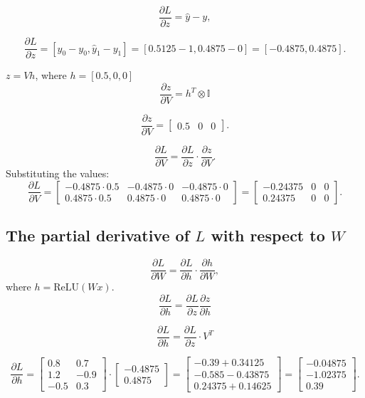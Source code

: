 \documentclass[12pt]{ass1.cls}
\begin{document}
\[
\frac{\partial L}{\partial z} = \hat{y} - y,
\]

\[
\frac{\partial L}{\partial z} = [\hat{y}_0 - y_0, \hat{y}_1 - y_1] = [0.5125 - 1, 0.4875 - 0] = [-0.4875, 0.4875].
\]

                                                            \( z = Vh \), where \( h = [0.5, 0, 0] \)
\[
\frac{\partial z}{\partial V} = h^T\otimes \mathbb{I}
\]


\[
\frac{\partial z}{\partial V} = \begin{bmatrix}
    0.5 &0 &0 
\end{bmatrix}.
\]

\[
\frac{\partial L}{\partial V} = \frac{\partial L}{\partial z} \cdot \frac{\partial z}{\partial V}.
\]
Substituting the values:
\[
\frac{\partial L}{\partial V} =
\begin{bmatrix}
-0.4875 \cdot 0.5 & -0.4875 \cdot 0 & -0.4875 \cdot 0 \\
0.4875 \cdot 0.5 & 0.4875 \cdot 0 & 0.4875 \cdot 0
\end{bmatrix}
=
\begin{bmatrix}
-0.24375 & 0 & 0 \\
0.24375 & 0 & 0
\end{bmatrix}.
\]








\newpage


\subsection*{The partial derivative of \( L \) with respect to \(W \)}

\[
\frac{\partial L}{\partial W} = \frac{\partial L}{\partial h} \cdot \frac{\partial h}{\partial W},
\]
where \( h = \text{ReLU}(Wx) \).
\[\frac{\partial L}{\partial h} =\frac{\partial L}{\partial z}\frac{\partial z}{\partial h} \]

\[
\frac{\partial L}{\partial h} =  \frac{\partial L}{\partial z}\cdot V^T
\]

\[
\frac{\partial L}{\partial h} =
\begin{bmatrix}
0.8 & 0.7 \\
1.2 & -0.9 \\
-0.5 & 0.3
\end{bmatrix}
\cdot
\begin{bmatrix}
-0.4875 \\
0.4875
\end{bmatrix}
=
\begin{bmatrix}
-0.39 + 0.34125 \\
-0.585 - 0.43875 \\
0.24375 + 0.14625
\end{bmatrix}
=
\begin{bmatrix}
-0.04875 \\
-1.02375 \\
0.39
\end{bmatrix}.
\]
\end{document}
